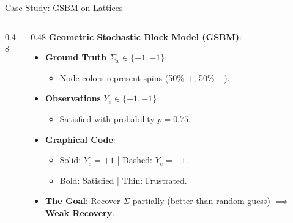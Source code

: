 \documentclass[A4,svgnames,9pt,aspectratio=169]{beamer}
\begin{document}
\begin{frame}{Case Study: GSBM on Lattices}
\begin{columns}[c, onlytextwidth]
\begin{column}{0.48\textwidth}
\begin{center}
            \end{center}
        \end{column}
        \begin{column}{0.48\textwidth}
            \textbf{Geometric Stochastic Block Model (GSBM)}:
            \begin{itemize}
                \setlength{\itemsep}{6pt}
                \item \textbf{Ground Truth} $\Sigma_x \in \{+1, -1\}$:
                \begin{itemize}
                    \item Node colors represent spins (50\% $+$, 50\% $-$).
                \end{itemize}
                \item \textbf{Observations} $Y_e \in \{+1, -1\}$:
                \begin{itemize}
                    \item Satisfied with probability $p = 0.75$.
                \end{itemize}
                \item \textbf{Graphical Code}:
                \begin{itemize}
                    \item Solid: $Y_e = +1$ | Dashed: $Y_e = -1$.
                    \item Bold: Satisfied | Thin: Frustrated.
                \end{itemize}
                \item \textbf{The Goal}: Recover $\Sigma$ partially (better than random guess) $\implies$ \textbf{Weak Recovery}.
            \end{itemize}
        \end{column}
    \end{columns}
\end{frame}
\end{document}
